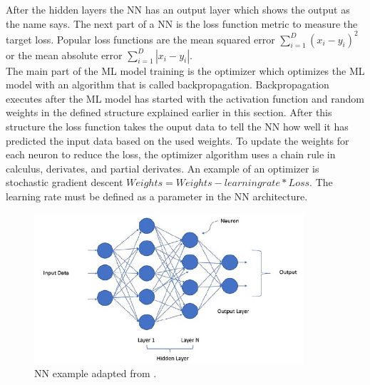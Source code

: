 After the hidden layers the NN has an output layer which shows the output as the name says. The next part of a NN is the loss function metric to measure the target loss. Popular loss functions \cite{DBLP:conf/cvpr/WanLC21} are the mean squared error $\sum_{i=1}^{D}(x_i-y_i)^2$ or the mean absolute error $\sum_{i=1}^{D}|x_i-y_i|$. \\ The main part of the ML model training is the optimizer which optimizes the ML model with an algorithm that is called backpropagation. Backpropagation executes after the ML model has started with the activation function and random weights in the defined structure explained earlier in this section. After this structure the loss function takes the ouput data to tell the NN how well it has predicted the input data based on the used weights. To update the weights for each neuron to reduce the loss, the optimizer algorithm uses a chain rule in calculus, derivates, and partial derivates. An example of an optimizer is stochastic gradient descent $Weights = Weights - learning rate * Loss$. The learning rate must be defined as a parameter in the NN architecture.

\begin{figure}[ht!]
  \centering
  \includegraphics[width=10cm]{pictures/neural_network.jpg}
  \caption{NN example adapted from \cite{moolayil_2019}.}
  \label{fig:neural_network}
\end{figure}
